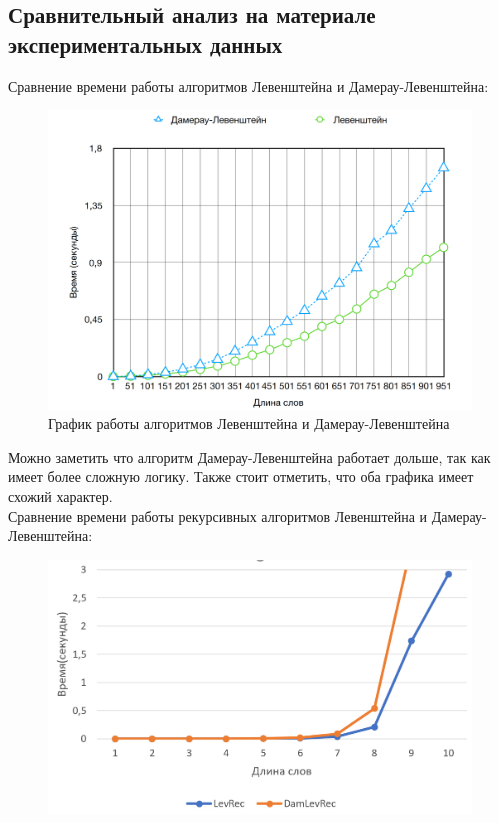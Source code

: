 \documentclass[a4paper, 12pt]{article}
\begin{document}
\begin{flushleft}
	\subsection{Сравнительный анализ на материале экспериментальных данных}
	\hspace*{5mm} Сравнение времени работы алгоритмов Левенштейна и Дамерау-Левенштейна:
	\begin{figure}[h]
		\centering \includegraphics[scale=0.7]{func1}
		\centering\caption{График работы алгоритмов Левенштейна и Дамерау-Левенштейна}
	\end{figure}
	\newpage
	\hspace*{5mm} Можно заметить что алгоритм Дамерау-Левенштейна работает дольше, так как имеет более сложную логику. Также стоит отметить, что оба графика имеет схожий характер. 
	\\ \hspace*{5mm} Сравнение времени работы рекурсивных алгоритмов Левенштейна и Дамерау-Левенштейна:
	\begin{figure}[h]
		\centering \includegraphics[scale=0.8]{rec}

\end{figure}
\end{flushleft}
\end{document}
